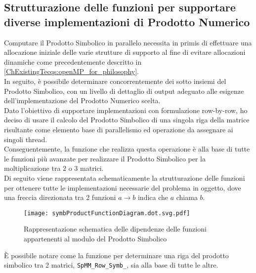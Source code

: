 \subsection[Strutturazione delle funzioni a supporto\\delle implementazioni del Prodotto Numerico]
{Strutturazione delle funzioni per supportare diverse implementazioni di Prodotto Numerico}
Computare il Prodotto Simbolico in parallelo necessita in primis di effettuare una 
allocazione iniziale delle varie strutture di supporto al fine di evitare allocazioni dinamiche
come precedentemente descritto in \ref{ChExistingTecqs:openMP_for_philosophy}.\\
In seguito, è possibile determinare concorrentemente dei sotto insiemi del Prodotto Simbolico, con un
livello di dettaglio di output adeguato alle esigenze dell'implementazione del Prodotto Numerico scelta.\\
\voidLine
Dato l'obiettivo di supportare implementazioni con formulazione row-by-row, ho deciso di usare 
il calcolo del Prodotto Simbolico di una singola riga della matrice risultante 
come elemento base di parallelismo ed operazione da assegnare ai singoli thread.\\
\label{chSpMMSymb:accurateBaseBlock}%
Conseguentemente, la funzione che realizza questa operazione è alla base di tutte le funzioni
più avanzate per realizzare il Prodotto Simbolico per la moltiplicazione tra 2 o 3 matrici.\\
Di seguito viene rappresentata schematicamente la strutturazione delle funzioni per ottenere tutte le implementazioni
necessarie del problema in oggetto,
dove una freccia direzionata tra 2 funzioni $a \rightarrow b$ indica che $a$ chiama $b$.\\
\begin{figure}[H]
  \caption[combo funzioni per il Prodotto Simbolico accurato]
  {Rappresentazione schematica delle dipendenze delle funzioni appartenenti al modulo del Prodotto Simbolico}
  \centering \texttt{[image: symbProductFunctionDiagram.dot.svg.pdf]} \decoRule
  \label{fig:symbProductFunctionDiagram}
\end{figure}
\label{SpMM_Row_Symb_}
È possibile notare come la funzione per determinare una riga del prodotto simbolico tra 2 matrici,
\verb|SpMM_Row_Symb_|, sia alla base di tutte le altre.\\ %

